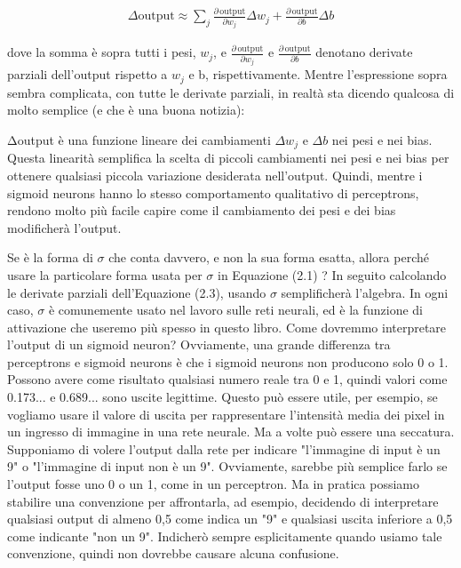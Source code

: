 \begin{eqnarray} 
  \Delta \mbox{output} \approx \sum_j \frac{\partial \, \mbox{output}}{\partial w_j}
  \Delta w_j + \frac{\partial \, \mbox{output}}{\partial b} \Delta b
\end{eqnarray}


dove la somma è sopra tutti i pesi, $w_j$, e $\frac{\partial \, \mbox{output}}{\partial w_j}$ e $\frac{\partial \, \mbox{output}}{\partial b}$ denotano derivate parziali dell'output rispetto a $w_j$ e b, rispettivamente.
Mentre l'espressione sopra sembra complicata, con tutte le derivate parziali, in realtà sta dicendo qualcosa di molto semplice (e che è una buona notizia):

Δoutput è una funzione lineare dei cambiamenti $\Delta w_j$ e $\Delta b$ nei pesi e nei bias. Questa linearità semplifica la scelta di piccoli cambiamenti nei pesi e nei bias per ottenere qualsiasi piccola variazione desiderata nell'output. Quindi, mentre i sigmoid neurons hanno lo stesso comportamento qualitativo di perceptrons, rendono molto più facile capire come il cambiamento dei pesi e dei bias modificherà l'output.

Se è la forma di $\sigma$ che conta davvero, e non la sua forma esatta, allora perché usare la particolare forma usata per $\sigma$ in Equazione (2.1) ? In seguito calcolando le derivate parziali dell'Equazione (2.3), usando $\sigma$ semplificherà l'algebra. In ogni caso, $\sigma$ è comunemente usato nel lavoro sulle reti neurali, ed è la funzione di attivazione che useremo più spesso in questo libro.
Come dovremmo interpretare l'output di un sigmoid neuron? Ovviamente, una grande differenza tra perceptrons e sigmoid neurons è che i sigmoid neurons non producono solo 0 o 1. Possono avere come risultato qualsiasi numero reale tra 0 e 1, quindi valori come 0.173... e 0.689... sono uscite legittime. Questo può essere utile, per esempio, se vogliamo usare il valore di uscita per rappresentare l'intensità media dei pixel in un ingresso di immagine in una rete neurale. Ma a volte può essere una seccatura. Supponiamo di volere l'output dalla rete per indicare "l'immagine di input è un 9" o "l'immagine di input non è un 9". Ovviamente, sarebbe più semplice farlo se l'output fosse uno 0 o un 1, come in un perceptron. Ma in pratica possiamo stabilire una convenzione per affrontarla, ad esempio, decidendo di interpretare qualsiasi output di almeno 0,5 come indica un "9" e qualsiasi uscita inferiore a 0,5 come indicante "non un 9". Indicherò sempre esplicitamente quando usiamo tale convenzione, quindi non dovrebbe causare alcuna confusione.


